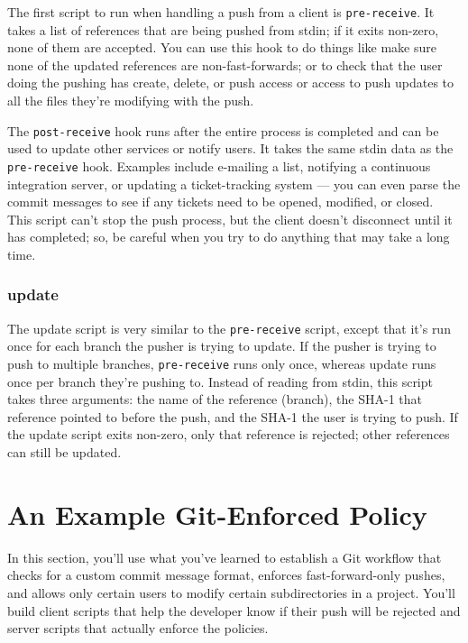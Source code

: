 \documentclass[a4paper]{book}
\newcounter{tab}[chapter]
\begin{document}
The first script to run when handling a push from a client is \texttt{pre-receive}. It takes a list of references that are being pushed from stdin; if it exits non-zero, none of them are accepted. You can use this hook to do things like make sure none of the updated references are non-fast-forwards; or to check that the user doing the pushing has create, delete, or push access or access to push updates to all the files they're modifying with the push.

The \texttt{post-receive} hook runs after the entire process is completed and can be used to update other services or notify users. It takes the same stdin data as the \texttt{pre-receive} hook. Examples include e-mailing a list, notifying a continuous integration server, or updating a ticket-tracking system --- you can even parse the commit messages to see if any tickets need to be opened, modified, or closed. This script can't stop the push process, but the client doesn't disconnect until it has completed; so, be careful when you try to do anything that may take a long time.

\subsubsection{update}

The update script is very similar to the \texttt{pre-receive} script, except that it's run once for each branch the pusher is trying to update. If the pusher is trying to push to multiple branches, \texttt{pre-receive} runs only once, whereas update runs once per branch they're pushing to. Instead of reading from stdin, this script takes three arguments: the name of the reference (branch), the SHA-1 that reference pointed to before the push, and the SHA-1 the user is trying to push. If the update script exits non-zero, only that reference is rejected; other references can still be updated.

\section{An Example Git-Enforced Policy}\label{an-example-git-enforced-policy}

In this section, you'll use what you've learned to establish a Git workflow that checks for a custom commit message format, enforces fast-forward-only pushes, and allows only certain users to modify certain subdirectories in a project. You'll build client scripts that help the developer know if their push will be rejected and server scripts that actually enforce the policies.
\end{document}
